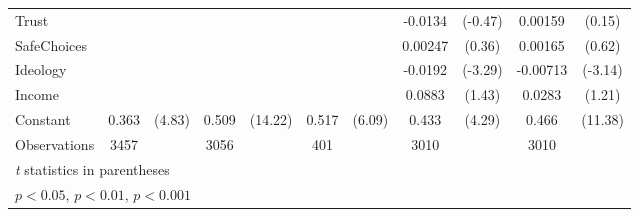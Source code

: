 {\begin{tabular}{l*{5}{cc}}
Trust           &                  &         &                  &         &                  &         &  -0.0134         &  (-0.47)&  0.00159         &   (0.15)\\
SafeChoices     &                  &         &                  &         &                  &         &  0.00247         &   (0.36)&  0.00165         &   (0.62)\\
Ideology        &                  &         &                  &         &                  &         &  -0.0192\sym{**} &  (-3.29)& -0.00713\sym{**} &  (-3.14)\\
Income          &                  &         &                  &         &                  &         &   0.0883         &   (1.43)&   0.0283         &   (1.21)\\
Constant        &    0.363\sym{***}&   (4.83)&    0.509\sym{***}&  (14.22)&    0.517\sym{***}&   (6.09)&    0.433\sym{***}&   (4.29)&    0.466\sym{***}&  (11.38)\\
\hline
Observations    &     3457         &         &     3056         &         &      401         &         &     3010         &         &     3010         &         \\
\hline\hline
\multicolumn{11}{l}{\footnotesize \textit{t} statistics in parentheses}\\
\multicolumn{11}{l}{\footnotesize \sym{*} \(p<0.05\), \sym{**} \(p<0.01\), \sym{***} \(p<0.001\)}\\
\end{tabular}
}
